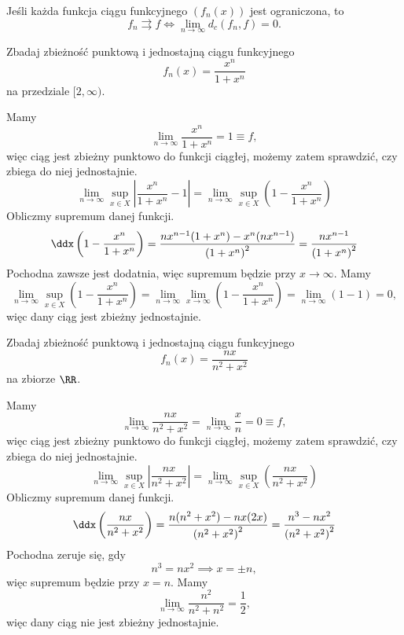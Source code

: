 \begin{theorem}
    \label{t:uniform convergence iff metric = 0}
    Jeśli każda funkcja ciągu funkcyjnego $(f_n(x))$ jest ograniczona, to
    \[ f_n \rightrightarrows f \Longleftrightarrow \lim_{n\to\infty}d_c(f_n, f) = 0 .\]
\end{theorem}

\begin{example}
    Zbadaj zbieżność punktową i jednostajną ciągu funkcyjnego
    \[ f_n(x) = \frac{x^n}{1 + x^n} \]
    na przedziale $[2, \infty)$.
\end{example}
\begin{solution}
    Mamy
    \[ \lim_{n\to\infty} \frac{x^n}{1 + x^n} = 1 \equiv f, \]
    więc ciąg jest zbieżny punktowo do funkcji ciągłej, możemy zatem sprawdzić, czy zbiega do niej jednostajnie.
    \[ \lim_{n\to\infty}\sup_{x\in X} \left|\frac{x^n}{1 + x^n} - 1\right| = \lim_{n\to\infty}\sup_{x\in X} \left(1 - \frac{x^n}{1 + x^n}\right)\]
    Obliczmy supremum danej funkcji.
    \[ \ddx \left(1 - \frac{x^n}{1 + x^n}\right) = \frac{nx^{n-1}(1 + x^n) - x^n(nx^{n-1})}{\left(1 + x^n\right)^2} = \frac{nx^{n-1}}{\left(1 + x^n\right)^2} \]
    Pochodna zawsze jest dodatnia, więc supremum będzie przy $x \to \infty$. Mamy
    \[ \lim_{n\to\infty}\sup_{x\in X} \left(1 - \frac{x^n}{1 + x^n}\right) = \lim_{n\to\infty}\lim_{x\to\infty} \left(1 - \frac{x^n}{1 + x^n}\right) = \lim_{n\to\infty} \left(1 - 1\right) = 0, \]
    więc dany ciąg jest zbieżny jednostajnie.
\end{solution}

\begin{example}
    Zbadaj zbieżność punktową i jednostajną ciągu funkcyjnego
    \[ f_n(x) = \frac{nx}{n^2 + x^2} \]
    na zbiorze $\RR$.
\end{example}
\begin{solution}
    Mamy
    \[ \lim_{n\to\infty} \frac{nx}{n^2 + x^2} = \lim_{n\to\infty} \frac{x}{n} = 0 \equiv f, \]
    więc ciąg jest zbieżny punktowo do funkcji ciągłej, możemy zatem sprawdzić, czy zbiega do niej jednostajnie.
    \[ \lim_{n\to\infty}\sup_{x\in X} \left|\frac{nx}{n^2 + x^2}\right| = \lim_{n\to\infty}\sup_{x\in X} \left(\frac{nx}{n^2 + x^2}\right) \]
    Obliczmy supremum danej funkcji.
    \[ \ddx \left(\frac{nx}{n^2 + x^2}\right) = \frac{n(n^2 + x^2) - nx(2x)}{\left(n^2 + x^2\right)^2} = \frac{n^3 - nx^2}{\left(n^2 + x^2\right)^2} \]
    Pochodna zeruje się, gdy
    \[ n^3 = nx^2 \implies x = \pm n, \]
    więc supremum będzie przy $x = n$. Mamy
    \[ \lim_{n\to\infty}\frac{n^2}{n^2 + n^2} = \frac{1}{2}, \]
    więc dany ciąg nie jest zbieżny jednostajnie.
\end{solution}


